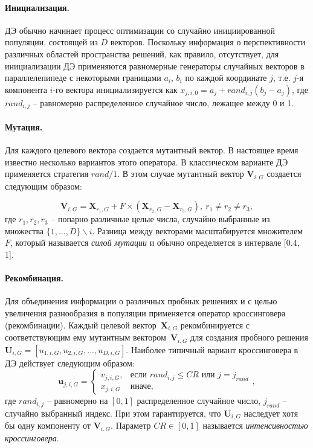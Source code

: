\paragraph*{Инициализация.}

ДЭ обычно начинает процесс оптимизации со случайно инициированной популяции, состоящей из $D$ векторов.
Поскольку информация о перспективности различных областей пространства решений, как правило, отсутствует,
для инициализации ДЭ применяются равномерные генераторы случайных векторов в параллелепипеде с некоторыми
границами $a_i$, $b_i$ по каждой координате
$j$, т.е. $j$-я компонента $i$-го вектора
инициализируется как $x_{j, i, 0} = a_{j} + rand_{i,j}(b_j - a_j )$,
где $rand_{i,j}$ -- равномерно распределенное случайное число, лежащее между 0 и 1.

\paragraph*{Мутация.}

Для каждого целевого вектора создается мутантный вектор. В настоящее время известно несколько вариантов этого оператора.
В классическом варианте ДЭ применяется стратегия $rand/1$. В этом случае мутантный вектор $\textbf{V}_{i,G}$ создается следующим
образом:

\begin{equation}\label{eq:de_mut}
  \textbf{V}_{i,G} = \textbf{X}_{r_1,G} + F \times (\textbf{X}_{r_2,G} - \textbf{X}_{r_3,G}), \ r_1 \neq r_2 \neq r_3,
\end{equation}
где $r_1, r_2, r_3 $ -- попарно различные целые числа, случайно выбранные из множества $\{1,...,D\}\backslash i$.
Разница между векторами масштабируется множителем $F$, который
называется {\em силой мутации} и обычно определяется в интервале [0.4, 1].

\paragraph*{Рекомбинация.}

Для объединения информации о различных пробных решениях и с целью увеличения разнообразия в популяции применяется оператор
кроссинговера (рекомбинации). Каждый целевой вектор~$\textbf{X}_{i,G}$ рекомбинируется с соответствующим ему мутантным
вектором~$\textbf{V}_{i,G}$ для создания пробного решения $\textbf{U}_{i,G} = [u_{1,i,G}, u_{2,i,G}, ..., u_{D,i,G}]$.
Наиболее типичный вариант кроссинговера в ДЭ действует следующим образом:
\begin{equation}\label{eq:de_crossover}
  \textbf{u}_{j,i,G} =
    \begin{cases}
     v_{j,i,G}, & \mbox{если~} rand_{i,j} \leq CR \mbox{~или~} j = j_{rand} \\
     x_{j,i,G} & \mbox{иначе},
    \end{cases},
\end{equation}
где $rand_{i,j}$ -- равномерно на $[0, 1]$ распределенное случайное число, $j_{rand}$ -- случайно выбранный индекс. При этом
гарантируется, что $\textbf{U}_{i,G}$ наследует хотя бы одну компоненту от $\textbf{V}_{i,G}$. Параметр
$CR \in [0, 1]$ называется {\em интенсивностью кроссинговера}.


